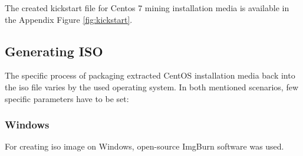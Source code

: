 \documentclass[
  printed, %
  table,   %
  lof,     %
  lot,     %
           oneside, color
]{fithesis3}
\renewcommand{\texttt}[1]{%
  \begingroup
  \ttfamily
  \begingroup\lccode`~=`/\lowercase{\endgroup\def~}{/\discretionary{}{}{}}%
  \begingroup\lccode`~=`[\lowercase{\endgroup\def~}{[\discretionary{}{}{}}%
  \begingroup\lccode`~=`.\lowercase{\endgroup\def~}{.\discretionary{}{}{}}%
  \catcode`/=\active\catcode`[=\active\catcode`.=\active
  \scantokens{#1\noexpand}%
  \endgroup
}
\begin{document}
The created kickstart file for Centos 7 mining installation media is available in the Appendix Figure \ref{fig:kickstart}. 

\subsection{Generating ISO}
The specific process of packaging extracted CentOS installation media back into the iso file varies by the used operating system. In both mentioned scenarios, few specific parameters have to be set:
\subsubsection{Windows}
For creating iso image on Windows, open-source ImgBurn software was used. 
\end{document}
